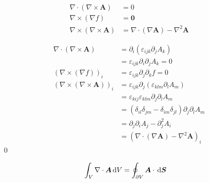 \documentclass[uplatex,dvipdfmx,a4paper,11pt]{jlreq}
\makeatletter
\renewcommand{\AA}{\bm{A}}
\newcommand{\grad}{\nabla}
\renewcommand{\div}{\nabla\cdot}
\newcommand{\rot}{\nabla\times}
\newcommand{\laplacian}{\nabla^2}
\theoremstyle{definition}
\renewenvironment{proof}[1][\proofname]{\par
  \normalfont
  \topsep6\p@\@plus6\p@ \trivlist
  \item[\hskip\labelsep{\bfseries #1}\@addpunct{\bfseries}]\ignorespaces\quad\par
}{%
  \qed\endtrivlist\@endpefalse
}
\renewcommand\proofname{証明}
\makeatother
\begin{document}
\begin{theorem}[有名定理]
  \begin{align}
    \div{(\rot{\bm{A}})} & = 0                                          \\
    \rot{(\grad{f})}     & = \bm{0}                                     \\
    \rot{(\rot{\bm{A}})} & = \div{(\grad{\bm{A}})} - \laplacian{\bm{A}}
  \end{align}
\end{theorem}
\begin{proof}
  \begin{align}
    \div{(\rot{\bm{A}})}     & = \partial_i(\varepsilon_{ijk}\partial_jA_k)                               \\
                             & = \varepsilon_{ijk}\partial_i\partial_jA_k = 0                             \\
    (\rot{(\grad{f})})_i     & = \varepsilon_{ijk}\partial_j\partial_kf = 0                               \\
    (\rot{(\rot{\bm{A}})})_i & = \varepsilon_{ijk}\partial_j(\varepsilon_{klm}\partial_lA_m)              \\
                             & = \varepsilon_{kij}\varepsilon_{klm}\partial_j\partial_lA_m                \\
                             & = (\delta_{il}\delta_{jm} - \delta_{im}\delta_{jl})\partial_j\partial_lA_m \\
                             & = \partial_j\partial_iA_j - \partial_j^2A_i                                \\
                             & = (\div{(\grad{\bm{A}})} - \laplacian{\bm{A}})_i
  \end{align}
\end{proof}

\begin{theorem}
  \begin{align}
    \int_V\div{\AA}\dl{V} & = \oint_{\partial V}\AA\cdot\dl{\bm{S}}
  \end{align}
\end{theorem}
\end{document}
